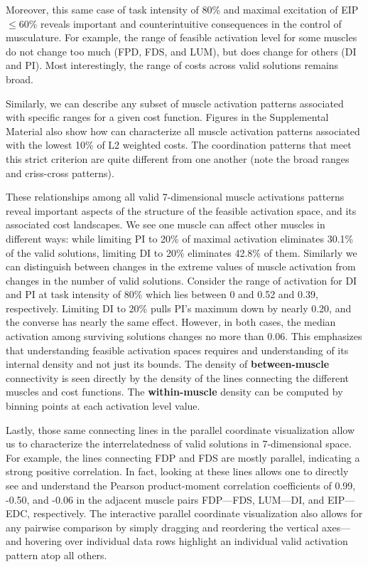 \documentclass[9pt,twocolumn,twoside,lineno]{pnas-new}
\begin{document}
Moreover, this same case of task intensity of 80\% and maximal excitation of EIP $\le$60\% reveals important and counterintuitive consequences in the control of musculature. For example, the range of feasible activation level for some muscles do not change too much (FPD, FDS, and LUM), but does change for others (DI and PI). Most interestingly, the range of costs across valid solutions remains broad.

Similarly, we can describe any subset of muscle activation patterns associated with specific ranges for a given cost function. Figures in the Supplemental Material also show how can characterize all muscle activation patterns associated with the lowest 10\% of L2 weighted costs. The coordination patterns that meet this strict criterion are quite different from one another (note the broad ranges and criss-cross patterns).

These relationships among all valid 7-dimensional muscle activations patterns reveal important aspects of the structure of the feasible activation space, and its associated cost landscapes. We see one muscle can affect other muscles in different ways: while limiting PI to 20\% of maximal activation eliminates 30.1\% of the valid solutions, limiting DI to 20\% eliminates 42.8\% of them. Similarly we can distinguish between changes in the extreme values of muscle activation from changes in the number of valid solutions. Consider the range of activation for DI and PI at task intensity of 80\% which lies between 0 and 0.52 and 0.39, respectively. Limiting DI to 20\% pulls PI’s maximum down by nearly 0.20, and the converse has nearly the same effect. However, in both cases, the median activation among surviving solutions changes no more than 0.06. This emphasizes that understanding feasible activation spaces requires and understanding of its internal density and not just its bounds. The density of \textbf{between-muscle} connectivity is seen directly by the density of the lines connecting the different muscles and cost functions. The \textbf{within-muscle} density can be computed by binning points at each activation level value.

Lastly, those same connecting lines in the parallel coordinate visualization allow us to characterize the interrelatedness of valid solutions in 7-dimensional space. For example, the lines connecting FDP and FDS are mostly parallel, indicating a strong positive correlation. In fact, looking at these lines allows one to directly see and understand the Pearson product-moment correlation coefficients of 0.99, -0.50, and -0.06 in the adjacent muscle pairs FDP—FDS, LUM—DI, and EIP—EDC, respectively. The interactive parallel coordinate visualization also allows for any pairwise comparison by simply dragging and reordering the vertical axes---and hovering over individual data rows highlight an individual valid activation pattern atop all others.
\end{document}
